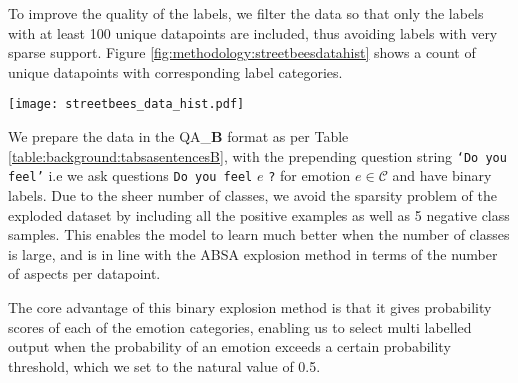To improve the quality of the labels, we filter the data so that only the labels with at least 100 unique datapoints are included, thus avoiding labels with very sparse support. Figure \ref{fig:methodology:streetbeesdatahist} shows a count of unique datapoints with corresponding label categories.
\begin{center}
	\texttt{[image: streetbees\_data\_hist.pdf]}
	\label{fig:methodology:streetbeesdatahist}
\end{center}

We prepare the data in the QA\_\textbf{B} format as per Table \ref{table:background:tabsasentencesB}, with the prepending question string \texttt{`Do you feel'} i.e we ask questions \texttt{Do you feel} $e$ \texttt{?} for emotion $e \in \mathcal{C}$ and have binary labels. Due to the sheer number of classes, we avoid the sparsity problem of the exploded dataset by including all the positive examples as well as 5 negative class samples. This enables the model to learn much better when the number of classes is large, and is in line with the ABSA explosion method in terms of the number of aspects per datapoint.

The core advantage of this binary explosion method is that it gives probability scores of each of the emotion categories, enabling us to select multi labelled output when the probability of an emotion exceeds a certain probability threshold, which we set to the natural value of 0.5.


